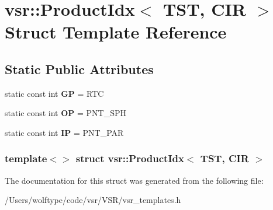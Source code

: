 \hypertarget{structvsr_1_1_product_idx_3_01_t_s_t_00_01_c_i_r_01_4}{\section{vsr\-:\-:Product\-Idx$<$ T\-S\-T, C\-I\-R $>$ Struct Template Reference}
\label{structvsr_1_1_product_idx_3_01_t_s_t_00_01_c_i_r_01_4}
}
\subsection*{Static Public Attributes}
\begin{DoxyCompactItemize}
\item 
\hypertarget{structvsr_1_1_product_idx_3_01_t_s_t_00_01_c_i_r_01_4_a5f59f3083b894cdcf5885445b3b29528}{static const int {\bfseries G\-P} = R\-T\-C}\label{structvsr_1_1_product_idx_3_01_t_s_t_00_01_c_i_r_01_4_a5f59f3083b894cdcf5885445b3b29528}

\item 
\hypertarget{structvsr_1_1_product_idx_3_01_t_s_t_00_01_c_i_r_01_4_a2eac56ed2fb17c2b3244cafbaf596446}{static const int {\bfseries O\-P} = P\-N\-T\-\_\-\-S\-P\-H}\label{structvsr_1_1_product_idx_3_01_t_s_t_00_01_c_i_r_01_4_a2eac56ed2fb17c2b3244cafbaf596446}

\item 
\hypertarget{structvsr_1_1_product_idx_3_01_t_s_t_00_01_c_i_r_01_4_a028ccbe4e85779e22c602d2343061822}{static const int {\bfseries I\-P} = P\-N\-T\-\_\-\-P\-A\-R}\label{structvsr_1_1_product_idx_3_01_t_s_t_00_01_c_i_r_01_4_a028ccbe4e85779e22c602d2343061822}

\end{DoxyCompactItemize}
\subsubsection*{template$<$$>$ struct vsr\-::\-Product\-Idx$<$ T\-S\-T, C\-I\-R $>$}



The documentation for this struct was generated from the following file\-:\begin{DoxyCompactItemize}
\item 
/\-Users/wolftype/code/vsr/\-V\-S\-R/vsr\-\_\-templates.\-h\end{DoxyCompactItemize}
